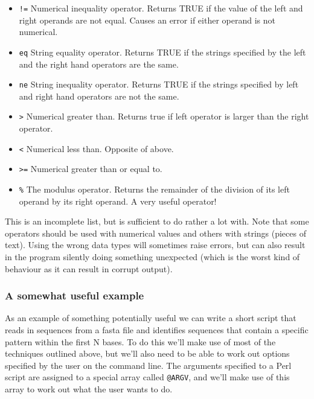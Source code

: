 \documentclass[11pt]{article}
\begin{document}
\begin{itemize}
\item \texttt{!=} Numerical inequality operator. Returns TRUE if the value of the
left and right operands are not equal. Causes an error if either
operand is not numerical.

\item \texttt{eq} String equality operator. Returns TRUE if the strings specified
by the left and the right hand operators are the same.

\item \texttt{ne} String inequality operator. Returns TRUE if the strings specified
by left and right hand operators are not the same.
\item \texttt{>} Numerical greater than. Returns true if left operator is larger than
the right operator.

\item \texttt{<} Numerical less than. Opposite of above.

\item \texttt{>=} Numerical greater than or equal to.

\item \texttt{\%} The modulus operator. Returns the remainder of the division of
  its left operand by its right operand. A very useful operator!
\end{itemize}

This is an incomplete list, but is sufficient to do rather a lot with. Note
that some operators should be used with numerical values and others with strings
(pieces of text). Using the wrong data types will sometimes raise errors, but
can also result in the program silently doing something unexpected (which is the
worst kind of behaviour as it can result in corrupt output).

\subsubsection{A somewhat useful example}
\label{sec-5-0-8}

As an example of something potentially useful we can write a short script
that reads in sequences from a fasta file and identifies sequences that
contain a specific pattern within the first N bases. To do this we'll
make use of most of the techniques outlined above, but we'll also need
to be able to work out options specified by the user on the command
line. The arguments specified to a Perl script are assigned to a special
array called \texttt{@ARGV}, and we'll make use of this array to work out what
the user wants to do.
\end{document}
